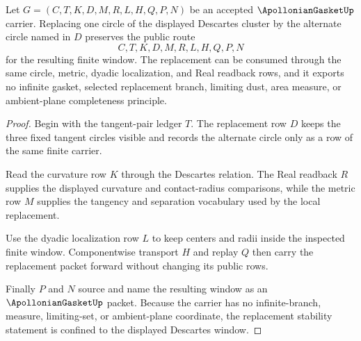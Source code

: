 \begin{theorem}
\label{thm:apollonian-gasket-descartes-replacement-stability}
Let $G=(C,T,K,D,M,R,L,H,Q,P,N)$ be an accepted $\ApollonianGasketUp$ carrier. Replacing one circle of the displayed Descartes cluster by the alternate circle named in $D$ preserves the public route
$$
C,T,K,D,M,R,L,H,Q,P,N
$$
for the resulting finite window. The replacement can be consumed through the same circle, metric, dyadic localization, and Real readback rows, and it exports no infinite gasket, selected replacement branch, limiting dust, area measure, or ambient-plane completeness principle.
\end{theorem}
\begin{proof}
Begin with the tangent-pair ledger $T$. The replacement row $D$ keeps the three fixed tangent circles visible and records the alternate circle only as a row of the same finite carrier.

Read the curvature row $K$ through the Descartes relation. The Real readback $R$ supplies the displayed curvature and contact-radius comparisons, while the metric row $M$ supplies the tangency and separation vocabulary used by the local replacement.

Use the dyadic localization row $L$ to keep centers and radii inside the inspected finite window. Componentwise transport $H$ and replay $Q$ then carry the replacement packet forward without changing its public rows.

Finally $P$ and $N$ source and name the resulting window as an $\ApollonianGasketUp$ packet. Because the carrier has no infinite-branch, measure, limiting-set, or ambient-plane coordinate, the replacement stability statement is confined to the displayed Descartes window.
\end{proof}


